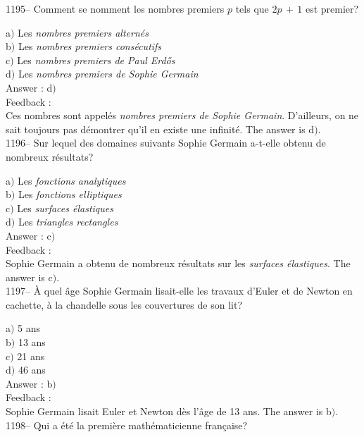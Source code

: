 ﻿\documentclass[letterpaper, 12pt]{article}
\begin{document}
1195-- Comment se nomment les nombres premiers $p$ tels que
$2p\,+\,1$ est premier?

a$)$ Les {\sl nombres premiers altern\'es} \\
b$)$ Les {\sl nombres premiers cons\'ecutifs} \\
c$)$ Les {\sl nombres premiers de Paul Erd\H{o}s} \\
d$)$ Les {\sl nombres premiers de Sophie Germain}\\

Answer : d$)$\\

Feedback : \\
Ces nombres sont appel\'es {\sl nombres premiers de Sophie Germain}.
D'ailleurs, on ne sait toujours pas d\'emontrer qu'il en existe une
infinit\'e.
The answer is d$)$.\\

1196-- Sur lequel des domaines suivants Sophie Germain a-t-elle
obtenu de nombreux r\'esultats?

a$)$ Les {\sl fonctions analytiques} \\
b$)$ Les {\sl fonctions elliptiques} \\
c$)$ Les {\sl surfaces \'elastiques} \\
d$)$ Les {\sl triangles rectangles}\\

Answer : c$)$\\

Feedback : \\
Sophie Germain a obtenu de nombreux r\'esultats sur les {\sl
surfaces \'elastiques}.
The answer is c$)$.\\

1197-- \`A quel \^age Sophie Germain lisait-elle les travaux d'Euler
et de Newton en cachette, \`a la chandelle sous les couvertures de
son lit?

a$)$ 5 ans \\
b$)$ 13 ans \\
c$)$ 21 ans \\
d$)$ 46 ans\\

Answer : b$)$\\

Feedback : \\
Sophie Germain lisait Euler et Newton d\`es l'\^age de 13 ans.
The answer is b$)$.\\

1198-- Qui a \'et\'e la premi\`ere math\'ematicienne fran\c caise?
\end{document}
